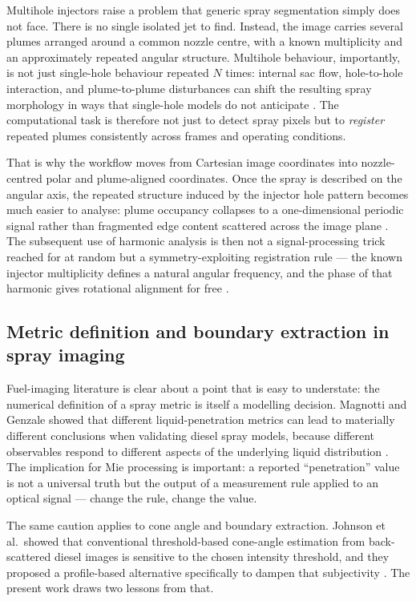 \documentclass[english, 12pt, a4paper, elec, utf8, a-2b, online]{aaltothesis}
\begin{document}
Multihole injectors raise a problem that generic spray segmentation simply does not face. 
There is no single isolated jet to find. 
Instead, the image carries several plumes arranged around a common nozzle centre, 
with a known multiplicity and an approximately repeated angular structure. 
Multihole behaviour, importantly, is not just single-hole behaviour repeated \(N\) times: 
internal sac flow, hole-to-hole interaction, and plume-to-plume disturbances can shift the resulting spray morphology in ways that single-hole models 
do not anticipate \cite{JinKimKakamiNishidaOgataLuo2020,MopuriGrahnSedarskyHyvonen2024}. 
The computational task is therefore not just to detect spray pixels but to \emph{register} repeated plumes 
consistently across frames and operating conditions.

That is why the workflow moves from Cartesian image coordinates into nozzle-centred polar and plume-aligned coordinates. 
Once the spray is described on the angular axis, the repeated structure induced by the injector hole pattern becomes much easier to analyse: 
plume occupancy collapses to a one-dimensional periodic signal rather than fragmented edge content scattered across the image plane 
\cite{Szeliski2010Vision}. 
The subsequent use of harmonic analysis is then not a signal-processing trick reached for at random but a symmetry-exploiting registration rule 
--- the known injector multiplicity defines a natural angular frequency, and the phase of that harmonic gives rotational alignment for free 
\cite{CooleyTukey1965FFT}.

\subsection{Metric definition and boundary extraction in spray imaging}

Fuel-imaging literature is clear about a point that is easy to understate: 
the numerical definition of a spray metric is itself a modelling decision. 
Magnotti and Genzale showed that different liquid-penetration metrics can lead to materially different conclusions when validating diesel spray models, 
because different observables respond to different aspects of the underlying liquid distribution \cite{MagnottiGenzale2013}. 
The implication for Mie processing is important: a reported ``penetration'' value is not a universal truth but the output of a measurement rule 
applied to an optical signal --- change the rule, change the value.

The same caution applies to cone angle and boundary extraction. 
Johnson et al.\ showed that conventional threshold-based cone-angle estimation from back-scattered diesel images 
is sensitive to the chosen intensity threshold, 
and they proposed a profile-based alternative specifically to dampen that subjectivity \cite{JohnsonNaberLee2012}. 
The present work draws two lessons from that. 
\end{document}
